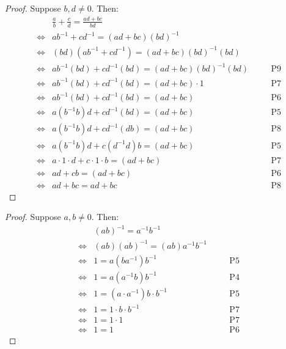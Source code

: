 \begin{proof}
    Suppose $b, d \not = 0$. Then:
    \begin{align*}
        &\frac{a}{b} + \frac{c}{d} = \frac{ad + bc}{bd} \\
        \iff& ab^{-1} + cd^{-1} = (ad + bc)(bd)^{-1} && \\
        \iff& (bd)(ab^{-1} + cd^{-1}) = (ad + bc)(bd)^{-1}(bd) && \\
        \iff& ab^{-1}(bd) + cd^{-1}(bd) = (ad + bc)(bd)^{-1}(bd) && \quad \text{P9} \\
        \iff& ab^{-1}(bd) + cd^{-1}(bd) = (ad + bc) \cdot 1 && \quad \text{P7} \\
        \iff& ab^{-1}(bd) + cd^{-1}(bd) = (ad + bc) && \quad \text{P6} \\
        \iff& a(b^{-1}b)d + cd^{-1}(bd) = (ad + bc) && \quad \text{P5} \\
        \iff& a(b^{-1}b)d + cd^{-1}(db) = (ad + bc) && \quad \text{P8} \\
        \iff& a(b^{-1}b)d + c(d^{-1}d)b = (ad + bc) && \quad \text{P5} \\
        \iff& a \cdot 1 \cdot d + c \cdot 1 \cdot b = (ad + bc) && \quad \text{P7} \\
        \iff& ad + cb = (ad + bc) && \quad \text{P6} \\
        \iff& ad + bc = ad + bc && \quad \text{P8} 
    \end{align*}
\end{proof}

\begin{proof}
    Suppose $a, b \not = 0$. Then:
    \begin{align*}
        &(ab)^{-1} = a^{-1}b^{-1} &&\quad \text{} \\
            \iff & (ab)(ab)^{-1} = (ab)a^{-1}b^{-1} &&\quad \text{} \\
            \iff & 1 = a(ba^{-1})b^{-1} &&\quad \text{P5} \\
            \iff & 1 = a(a^{-1}b)b^{-1} &&\quad \text{P4} \\
            \iff & 1 = (a \cdot a^{-1})b \cdot b^{-1} &&\quad \text{P5} \\
            \iff & 1 = 1 \cdot b \cdot b^{-1} &&\quad \text{P7} \\
            \iff & 1 = 1 \cdot 1 &&\quad \text{P7} \\
            \iff & 1 = 1 &&\quad \text{P6}
    \end{align*}
\end{proof}

